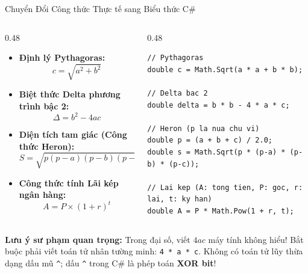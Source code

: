 \documentclass[aspectratio=169, 10pt]{beamer}
\begin{document}
\begin{frame}[fragile]{Chuyển Đổi Công thức Thực tế sang Biểu thức C\#}
  \begin{columns}[T]
    \begin{column}{0.48\textwidth}
      \begin{tcolorbox}[colback=UniLightBlue!30,colframe=UniBlue,title=\textbf{Công thức Toán học / Vật lý},fonttitle=\small\bfseries]
        \begin{itemize}\small
          \item \textbf{Định lý Pythagoras:}
            $$c = \sqrt{a^2 + b^2}$$
          \item \textbf{Biệt thức Delta phương trình bậc 2:}
            $$\Delta = b^2 - 4ac$$
          \item \textbf{Diện tích tam giác (Công thức Heron):}
            $$S = \sqrt{p(p-a)(p-b)(p-c)}$$
          \item \textbf{Công thức tính Lãi kép ngân hàng:}
            $$A = P \times (1 + r)^t$$
        \end{itemize}
      \end{tcolorbox}
    \end{column}

    \begin{column}{0.48\textwidth}
      \begin{tcolorbox}[colback=CodeBg,colframe=UniNavy,title=\textbf{Biểu thức C\# Tương ứng},fonttitle=\small\bfseries]
\begin{lstlisting}[numbers=none]
// Pythagoras
double c = Math.Sqrt(a * a + b * b);

// Delta bac 2
double delta = b * b - 4 * a * c;

// Heron (p la nua chu vi)
double p = (a + b + c) / 2.0;
double s = Math.Sqrt(p * (p-a) * (p-b) * (p-c));

// Lai kep (A: tong tien, P: goc, r: lai, t: ky han)
double A = P * Math.Pow(1 + r, t);
\end{lstlisting}
      \end{tcolorbox}
    \end{column}
  \end{columns}

  \begin{alertblock}{\textbf{Lưu ý sư phạm quan trọng:}}
    Trong đại số, viết $4ac$ máy tính không hiểu! Bắt buộc phải viết toán tử nhân tường minh: \texttt{4 * a * c}. Không có toán tử lũy thừa dạng dấu mũ \texttt{\textasciicircum}; dấu \texttt{\textasciicircum} trong C\# là phép toán \textbf{XOR bit}!
  \end{alertblock}
\end{frame}
\end{document}
